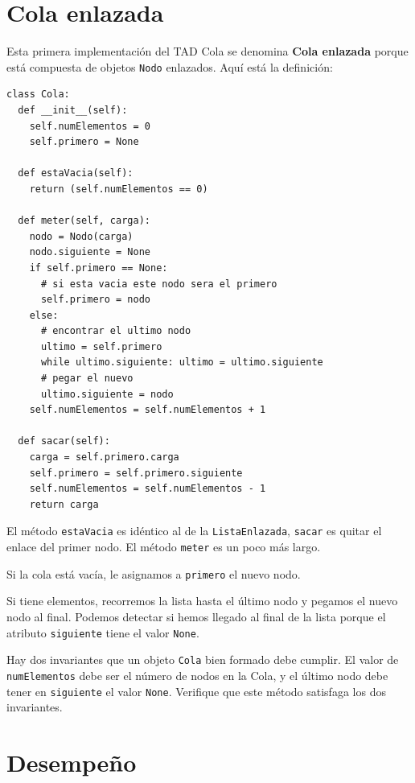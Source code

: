 \section{Cola enlazada}

 

Esta primera implementación del TAD Cola se denomina \textbf{Cola
enlazada} porque está compuesta de objetos \texttt{Nodo} enlazados.
Aquí está la definición:

\beforeverb 
\begin{verbatim}
class Cola:
  def __init__(self):
    self.numElementos = 0
    self.primero = None

  def estaVacia(self):
    return (self.numElementos == 0)

  def meter(self, carga):
    nodo = Nodo(carga)
    nodo.siguiente = None
    if self.primero == None:
      # si esta vacia este nodo sera el primero
      self.primero = nodo
    else:
      # encontrar el ultimo nodo
      ultimo = self.primero
      while ultimo.siguiente: ultimo = ultimo.siguiente
      # pegar el nuevo
      ultimo.siguiente = nodo
    self.numElementos = self.numElementos + 1

  def sacar(self):
    carga = self.primero.carga
    self.primero = self.primero.siguiente
    self.numElementos = self.numElementos - 1
    return carga
\end{verbatim}
\afterverb El método \texttt{estaVacia} es idéntico al de la \texttt{ListaEnlazada},
\texttt{sacar} es quitar el enlace del primer nodo. El método \texttt{meter}
es un poco más largo.

Si la cola está vacía, le asignamos a \texttt{primero} el nuevo nodo.

Si tiene elementos, recorremos la lista hasta el último nodo y pegamos
el nuevo nodo al final. Podemos detectar si hemos llegado al final
de la lista porque el atributo \texttt{siguiente} tiene el valor \texttt{None}.

Hay dos invariantes que un objeto \texttt{Cola} bien formado debe
cumplir. El valor de \texttt{numElementos} debe ser el número de nodos
en la Cola, y el último nodo debe tener en \texttt{siguiente} el valor
\texttt{None}. Verifique que este método satisfaga los dos invariantes.

\section{Desempeño}

